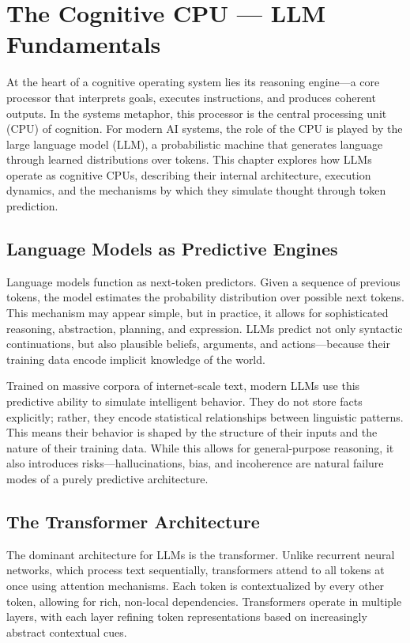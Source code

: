 \documentclass{book}
\begin{document}
\chapter{The Cognitive CPU — LLM Fundamentals}

At the heart of a cognitive operating system lies its reasoning engine—a core processor that interprets goals, executes instructions, and produces coherent outputs. In the systems metaphor, this processor is the central processing unit (CPU) of cognition. For modern AI systems, the role of the CPU is played by the large language model (LLM), a probabilistic machine that generates language through learned distributions over tokens. This chapter explores how LLMs operate as cognitive CPUs, describing their internal architecture, execution dynamics, and the mechanisms by which they simulate thought through token prediction.

\section{Language Models as Predictive Engines}

Language models function as next-token predictors. Given a sequence of previous tokens, the model estimates the probability distribution over possible next tokens. This mechanism may appear simple, but in practice, it allows for sophisticated reasoning, abstraction, planning, and expression. LLMs predict not only syntactic continuations, but also plausible beliefs, arguments, and actions—because their training data encode implicit knowledge of the world.

Trained on massive corpora of internet-scale text, modern LLMs use this predictive ability to simulate intelligent behavior. They do not store facts explicitly; rather, they encode statistical relationships between linguistic patterns. This means their behavior is shaped by the structure of their inputs and the nature of their training data. While this allows for general-purpose reasoning, it also introduces risks—hallucinations, bias, and incoherence are natural failure modes of a purely predictive architecture.

\section{The Transformer Architecture}

The dominant architecture for LLMs is the transformer. Unlike recurrent neural networks, which process text sequentially, transformers attend to all tokens at once using attention mechanisms. Each token is contextualized by every other token, allowing for rich, non-local dependencies. Transformers operate in multiple layers, with each layer refining token representations based on increasingly abstract contextual cues.
\end{document}

